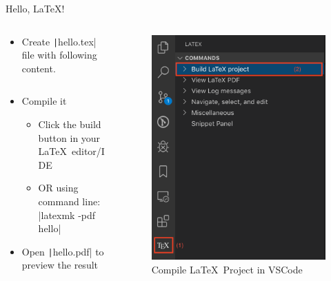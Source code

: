 \begin{frame}[fragile]{Hello, \LaTeX!}

  \begin{columns}
    \begin{column}{.7\linewidth}
      \begin{itemize}
        \item Create \texttt|hello.tex| file with following content.
              \inputminted{latex}{./minted/hello.tex}
        \item Compile it
              \begin{itemize}
                \item Click the build button in your \LaTeX~editor/IDE
                \item OR using command line: \bashinline|latexmk -pdf hello|
              \end{itemize}
        \item Open \texttt|hello.pdf| to preview the result
      \end{itemize}
    \end{column}

  \begin{column}{.3\linewidth}
      \begin{figure}
        \centering
        \includegraphics[width=\linewidth]{./figs/vscode-compile-project.png}
        \caption{Compile \LaTeX~Project in VSCode}
      \end{figure}
    \end{column}
  \end{columns}
\end{frame}

